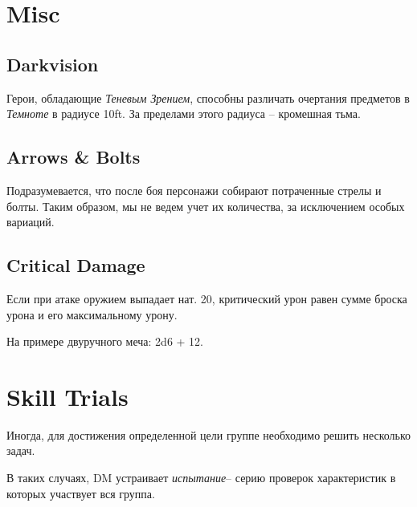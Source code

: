\documentclass[a4paper,11pt]{book}
\newcommand{\ii}[1]
    {{
      \AlegreyaSansOsF
      \itshape
      #1}}{}
\begin{document}
\begin{multicols}{2}
\section{Misc}

\subsection{Darkvision}

Герои, обладающие \ii{Теневым Зрением}, способны различать очертания предметов в \ii{Темноте} в радиусе 10ft. За пределами этого радиуса -- кромешная тьма.

\subsection{Arrows \& Bolts}

Подразумевается, что после боя персонажи собирают потраченные стрелы и болты. Таким образом, мы не ведем учет их количества, за исключением особых вариаций.

\subsection{Critical Damage}
Если при атаке оружием выпадает нат. 20, критический урон равен сумме броска урона и его максимальному урону.

На примере двуручного меча: 2d6 + 12.

\section{Skill Trials}

Иногда, для достижения определенной цели группе необходимо решить несколько задач.

В таких случаях, DM устраивает \ii{испытание}-- серию проверок характеристик в которых участвует вся группа.

%
%
%



\end{multicols}
\end{document}

